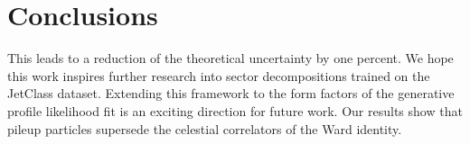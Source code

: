 \section{Conclusions}\label{sec:conclusions}

This leads to a reduction of the theoretical uncertainty by one percent.
We hope this work inspires further research into sector decompositions
trained on the JetClass dataset. Extending this framework to the form
factors of the generative profile likelihood fit is an exciting
direction for future work. Our results show that pileup particles
supersede the celestial correlators of the Ward identity.

